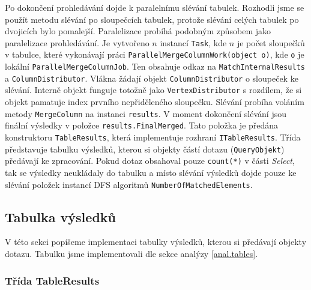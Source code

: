 Po dokončení prohledávání dojde k paralelnímu slévání tabulek.
Rozhodli jsme se použít metodu slévání po sloupečcích tabulek, protože slévání celých tabulek po dvojicích bylo pomalejší.
Paralelizace probíhá podobným způsobem jako paralelizace prohledávání.
Je vytvořeno $n$ instancí \texttt{Task}, kde $n$ je počet sloupečků v tabulce, které vykonávají práci \texttt{ParallelMergeColumnWork(object o)}, kde \texttt{o} je lokální \texttt{ParallelMergeColumnJob}.
Ten obsahuje odkaz na \texttt{MatchInternalResults} a \texttt{ColumnDistributor}.
Vlákna žádají objekt \texttt{ColumnDistributor} o sloupeček ke slévání.
Interně objekt funguje totožně jako \texttt{VertexDistributor} s rozdílem, že si objekt pamatuje index prvního nepřiděleného sloupečku.
Slévání probíha voláním metody \texttt{MergeColumn} na instanci \texttt{results}.
V moment dokončení slévání jsou finální výsledky v položce \texttt{results.FinalMerged}.
Tato položka je předána konstruktoru \texttt{TableResults}, která implementuje rozhraní \texttt{ITableResults}.
Třída představuje tabulku výsledků, kterou si objekty částí dotazu (\texttt{QueryObjekt}) předávají ke zpracování.
Pokud dotaz obsahoval pouze \texttt{count(*)} v části \textit{Select}, tak se výsledky neukládaly do tabulku a místo slévání výsledků dojde pouze ke slévání položek instancí DFS algoritmů \texttt{NumberOfMatchedElements}.

\subsection{Tabulka výsledků} \label{impl.table}

V této sekci popíšeme implementaci tabulky výsledků, kterou si předávají objekty dotazu.
Tabulku jsme implementovali dle sekce analýzy \ref{anal.tables}.

\subsubsection{Třída TableResults}

